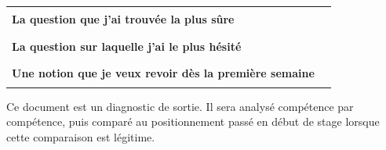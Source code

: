 \documentclass[10pt,a4paper]{article}
\begin{document}
\par\noindent\begin{tabularx}{\linewidth}{>{\bfseries}p{62mm} X}
\toprule
La question que j'ai trouvée la plus sûre & \rule{85mm}{0.32pt} \\
La question sur laquelle j'ai le plus hésité & \rule{85mm}{0.32pt} \\
Une notion que je veux revoir dès la première semaine & \rule{85mm}{0.32pt} \\
\bottomrule\end{tabularx}
\vfill
\begin{graybox}\small Ce document est un diagnostic de sortie. Il sera analysé compétence par compétence, puis comparé au positionnement passé en début de stage lorsque cette comparaison est légitime.\end{graybox}
\end{document}
